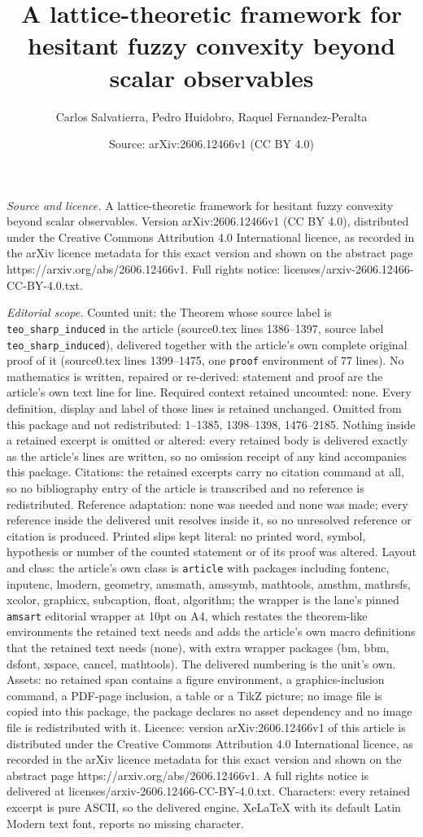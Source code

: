 \documentclass[10pt,a4paper]{amsart}
\title[A lattice-theoretic framework for hesitant fuzzy convexity b]{A lattice-theoretic framework for hesitant fuzzy convexity beyond scalar observables}
\author{Carlos Salvatierra, Pedro Huidobro, Raquel Fernandez-Peralta}
\date{Source: arXiv:2606.12466v1 (CC BY 4.0)}
\begin{document}
\maketitle

\noindent\emph{Source and licence.} A lattice-theoretic framework for hesitant fuzzy convexity beyond scalar observables. Version arXiv:2606.12466v1 (CC BY 4.0), distributed under the Creative Commons Attribution 4.0 International licence, as recorded in the arXiv licence metadata for this exact version and shown on the abstract page https://arxiv.org/abs/2606.12466v1. Full rights notice: licenses/arxiv-2606.12466-CC-BY-4.0.txt.\par\smallskip

\noindent\textit{Editorial scope.} Counted unit: the Theorem whose source label is \texttt{teo\_sharp\_induced} in the article (source0.tex lines 1386--1397, source label \texttt{teo\_sharp\_induced}), delivered together with the article's own complete original proof of it (source0.tex lines 1399--1475, one \texttt{proof} environment of 77 lines). No mathematics is written, repaired or re-derived: statement and proof are the article's own text line for line. Required context retained uncounted: none. Every definition, display and label of those lines is retained unchanged. Omitted from this package and not redistributed: 1--1385, 1398--1398, 1476--2185. Nothing inside a retained excerpt is omitted or altered: every retained body is delivered exactly as the article's lines are written, so no omission receipt of any kind accompanies this package. Citations: the retained excerpts carry no citation command at all, so no bibliography entry of the article is transcribed and no reference is redistributed. Reference adaptation: none was needed and none was made; every reference inside the delivered unit resolves inside it, so no unresolved reference or citation is produced. Printed slips kept literal: no printed word, symbol, hypothesis or number of the counted statement or of its proof was altered. Layout and class: the article's own class is \texttt{article} with packages including fontenc, inputenc, lmodern, geometry, amsmath, amssymb, mathtools, amsthm, mathrsfs, xcolor, graphicx, subcaption, float, algorithm; the wrapper is the lane's pinned \texttt{amsart} editorial wrapper at 10pt on A4, which restates the theorem-like environments the retained text needs and adds the article's own macro definitions that the retained text needs (none), with extra wrapper packages (bm, bbm, dsfont, xspace, cancel, mathtools). The delivered numbering is the unit's own. Assets: no retained span contains a figure environment, a graphics-inclusion command, a PDF-page inclusion, a table or a TikZ picture; no image file is copied into this package, the package declares no asset dependency and no image file is redistributed with it. Licence: version arXiv:2606.12466v1 of this article is distributed under the Creative Commons Attribution 4.0 International licence, as recorded in the arXiv licence metadata for this exact version and shown on the abstract page https://arxiv.org/abs/2606.12466v1. A full rights notice is delivered at licenses/arxiv-2606.12466-CC-BY-4.0.txt. Characters: every retained excerpt is pure ASCII, so the delivered engine, XeLaTeX with its default Latin Modern text font, reports no missing character.
\end{document}
